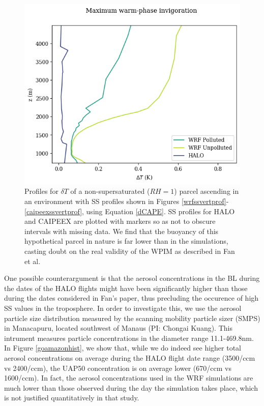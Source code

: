 \documentclass{article}
\begin{document}
\begin{figure}[ht]
    \centering
    \includegraphics[width=12cm]{wrf/combined_dT_profile_figure.png}
    \caption{Profiles for $\delta T$ of a non-supersaturated ($RH=1$) parcel ascending in an environment with SS profiles shown in Figures \ref{wrfssvertprof}-\ref{caipeexssvertprof}, using Equation \ref{dCAPE}. SS profiles for HALO and CAIPEEX are plotted with markers so as not to obscure intervals with missing data. We find that the buoyancy of this hypothetical parcel in nature is far lower than in the simulations, casting doubt on the real validity of the WPIM as described in Fan et al.}
    \label{dTprofiles}
\end{figure}

One possible counterargument is that the aerosol concentrations in the BL during the dates of the HALO flights might have been significantly higher than those during the dates considered in Fan's paper, thus precluding the occurence of high SS values in the troposphere. In order to investigate this, we use the aerosol particle size distribution measured by the scanning mobility particle sizer (SMPS) in Manacapuru, located southwest of Manaus (PI: Chongai Kuang). This intrument measures particle concentrations in the diameter range 11.1-469.8nm. In Figure \ref{goamazonhist}, we show that, while we do indeed see higher total aerosol concentrations on average during the HALO flight date range (3500/ccm vs 2400/ccm), the UAP50 concentration is on average lower (670/ccm vs 1600/ccm). In fact, the aerosol concentrations used in the WRF simulations are much lower than those observed during the day the simulation takes place, which is not justified quantitatively in that study.
\end{document}
